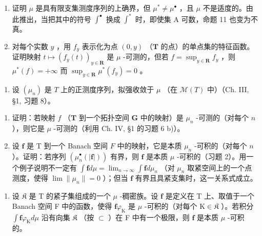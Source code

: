 \begin{enumerate}
\def\labelenumi{\alph{enumi})}
\item
  证明 \(\mu\) 是具有限支集测度序列的上确界，但 \(\mu^{*} \neq \mu^{\bullet}\) ，且 \(\mu\) 不是适度的。由此推出，当把其中的符号 \(\int^{\bullet}\) 换成 \(\int^{*}\) 时，即使集 A 可数，命题 11 也变为不真。
\item
  对每个实数 \(y\) ，用 \(f_y\) 表示化为点 \((0, y)\) （\(\mathbf{T}\) 的点）的单点集的特征函数。证明映射 \(t \mapsto (f_y(t))_{y \in \mathbf{R}}\) 是 \(\mu\) -可测的，但若 \(f = \sup_{y \in \mathbf{R}} f_y\) ，则 \(\mu^*(f) = +\infty\) 而 \(\sup_{y \in \mathbf{R}} \mu^*(f_y) = 0\) 。
\end{enumerate}

\begin{enumerate}
\def\labelenumi{\arabic{enumi})}
\setcounter{enumi}{4}
\tightlist
\item
  设 \((\mu_n)\) 是 \(T\) 上的正测度序列，拟强收敛于 \(\mu\) （在 \(\mathcal{M}(T)\) 中）（Ch. III, §1, 习题 8）。
\end{enumerate}

\begin{enumerate}
\def\labelenumi{\alph{enumi})}
\item
  证明：若映射 \(f\) （\(\mathbf{T}\) 到一个拓扑空间 \(\mathbf{G}\) 中的映射）是 \(\mu_n\) -可测的（对每个 \(n\) ），则它是 \(\mu\) -可测的（利用 Ch. IV, §1 的习题 6 b)）。
\item
  设 \(\mathbf{f}\) 是 T 到一个 Banach 空间 \(F\) 中的映射，它是本质 \(\mu_n\) -可积的（对每个 \(n\) ）。证明：若序列 \((\mu_n^\bullet (|\mathbf{f}|))\) 有界，则 \(\mathbf{f}\) 是本质 \(\mu\) -可积的（习题 2）。用一个例子说明不一定有 \(\int \mathbf{f} d\mu = \lim_{n\to \infty}\int \mathbf{f} d\mu_n\) （对 \(\mu_n\) 取紧空间上的一个点测度，使得 \(\lim \| \mu_n\| = 0\) ）；但当 \(\mathbf{f}\) 有界且具紧支集时，这一关系式成立。
\end{enumerate}

\begin{enumerate}
\def\labelenumi{\arabic{enumi})}
\setcounter{enumi}{5}
\tightlist
\item
  设 \(\mathfrak{K}\) 是 T 的紧子集组成的一个 \(\mu\) -稠密族。设 \(\mathbf{f}\) 是定义在 T 上、取值于一个 Banach 空间 F 中的函数，使得 \(\mathbf{f}\varphi_{\mathrm{K}}\) 是 \(\mu\) -可积的（对每个 \(\mathrm{K} \in \mathfrak{K}\) ）。若积分 \(\int \mathbf{f}\varphi_{\mathrm{K}} d\mu\) 沿有向集 \(\mathfrak{K}\) （按 \(\subset\) ）在 F 中有一个极限，则 \(\mathbf{f}\) 是本质 \(\mu\) -可积的。
\end{enumerate}

